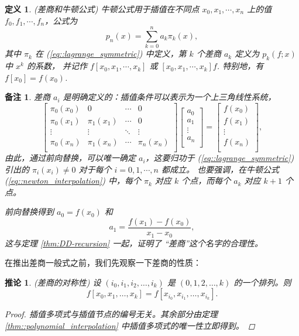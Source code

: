 \documentclass[a4paper]{ctexart}
\newtheorem{remark}{备注}
\newtheorem{definition}[theorem]{定义} %
\newtheorem{corollary}[theorem]{推论}
\numberwithin{theorem}{section}
\numberwithin{equation}{section}
\numberwithin{figure}{section}
\numberwithin{remark}{section}
\begin{document}
\begin{definition}
    \label{def::newton_interpolating}
(差商和牛顿公式) 牛顿公式用于插值在不同点 
$x_0, x_1, \cdots , x_n$ 上的值 $f_0 , f_1 , \cdots , f_n$，公式为
\begin{equation}
    \label{eq::newton_interpolation}
p_n(x) = \sum_{k=0}^{n} a_k \pi_k(x), 
\end{equation}
其中 $\pi_k$ 在 (\ref{eq::lagrange_symmetric}) 中定义，第 $k$ 个差商 $a_k$ 定义为 $p_k (f ; x)$ 中 $x^k$ 的系数，
并记作 $f [x_0 , x_1 , \cdots , x_k ]$ 或 $[x_0 , x_1 , \cdots , x_k ]f$.
特别地，有 $f [x_0 ] = f (x_0)$.
\end{definition}

\begin{remark}
差商 $a_i$ 是明确定义的：插值条件可以表示为一个上三角线性系统，
\[
\begin{bmatrix}
 \pi_0(x_0) & 0 & \cdots & 0 \\
 \pi_0(x_1) & \pi_1(x_1) & \cdots & 0 \\
 \vdots & \vdots & \ddots & \vdots \\
 \pi_0(x_n) & \pi_1(x_n) & \cdots & \pi_n(x_n) \\
\end{bmatrix} \begin{bmatrix}
 a_0 \\
 a_1 \\
 \vdots \\
 a_n \\
\end{bmatrix} = \begin{bmatrix}
 f (x_0) \\
 f (x_1) \\
 \vdots \\
 f (x_n) \\
\end{bmatrix},
\]
由此，通过前向替换，可以唯一确定 $a_i$，这要归功于 (\ref{eq::lagrange_symmetric}) 
引出的 $\pi_i(x_i) \neq 0$ 对于每个 $i = 0, 1, \cdots , n$ 都成立。
也要强调，在牛顿公式 (\ref{eq::newton_interpolation}) 中，每个 $\pi_k$ 对应 $k$ 个点，而每个 $a_k$ 对应 $k + 1$ 个点。

前向替换得到 $a_0 = f (x_0 )$ 和
\[
a_1 = \frac{f (x_1) - f (x_0)}{x_1 - x_0},
\]
这与定理 \ref{thm:DD-recursion} 一起，证明了 ``差商''这个名字的合理性。    
\end{remark}

在推出差商一般式之前，我们先观察一下差商的性质：

\begin{corollary}
    \label{thm:DD-recursion_permutation}
(差商的对称性)
设 $(i_0,i_1,i_2,\ldots,i_k)$ 是 $(0,1,2,\ldots,k)$ 的一个排列。则
\begin{equation}
    \label{eq::newton_permutation}
f[x_0,x_1,\ldots,x_k]=f[x_{i_0},x_{i_1},\ldots,x_{i_k}].
\end{equation}

\begin{proof}
插值多项式与插值节点的编号无关。其余部分由定理 \ref{thm::polynomial_interpolation} 中插值多项式的唯一性立即得到。
\end{proof}
\end{corollary}
\end{document}
